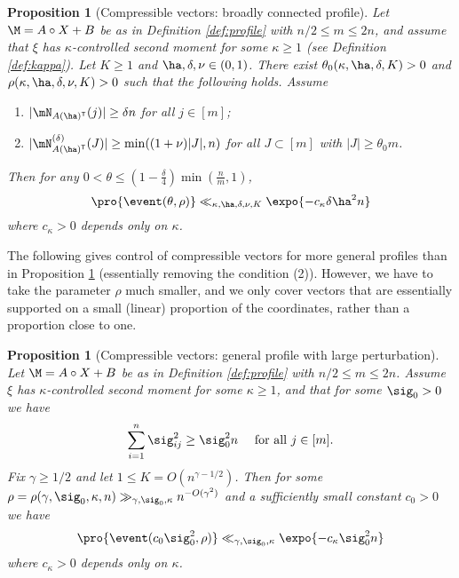 \documentclass[aop,preprint]{imsart}
\theoremstyle{plain}
\newtheorem{proposition}[theorem]{Proposition}
\theoremstyle{definition}
\theoremstyle{remark}
\newtheorem{remark}[theorem]{Remark}
\numberwithin{equation}{section}
\numberwithin{theorem}{section}
\def \tran {\mathsf{T}}
\begin{document}
\begin{proposition}[Compressible vectors: broadly connected profile]	\label{prop:slight}
Let $\M=A\circ X+B$ be as in Definition \ref{def:profile} with $n/2\le m\le 2n$, and assume that $\xi$ has $\kappa$-controlled second moment for some $\kappa\ge1$ (see Definition \ref{def:kappa}).
Let $K\ge1$ and $\ha,\delta,\nu\in (0,1)$.
There exist $\theta_0(\kappa,\ha,\delta,K)>0$ and $\rho(\kappa,\ha,\delta,\nu,K)>0$ such that the following holds. 
Assume
\begin{enumerate}[(1)]
\item $|\mN_{A(\ha)^\tran}(j)|\ge \delta n$ for all $j\in [m]$; \vspace{.2cm}
\item $|\mN_{A(\ha)^\tran}^{(\delta)}(J)| \ge \min((1+\nu)|J|,n)$ for all $J\subset[m]$ with $|J|\ge \theta_0m$.
\end{enumerate}
Then for any $0<\theta\le (1-\frac\delta4)\min(\frac{n}m,1)$, 
\begin{equation}
\pro{\event(\theta,\rho)}\ll_{\kappa,\ha,\delta,\nu,K} \expo{-c_\kappa\delta\ha^2n}
\end{equation}
where $c_\kappa>0$ depends only on $\kappa$.
\end{proposition}


The following gives control of compressible vectors for more general profiles than in Proposition \ref{prop:slight} (essentially removing the condition (2)). 
However, we have to take the parameter $\rho$ much smaller, and we only cover vectors that are essentially supported on a small (linear) proportion of the coordinates, rather than a proportion close to one. 

\begin{proposition}[Compressible vectors: general profile with large perturbation]	\label{prop:comp}
Let $\M=A\circ X+B$ be as in Definition \ref{def:profile} with $n/2\le m\le 2n$.
Assume $\xi$ has $\kappa$-controlled second moment for some $\kappa\ge1$, and that for some $\sig_0>0$ we have
\begin{equation}	\label{LB:columnvar}
\sum_{i=1}^n \sig_{ij}^2\ge \sig_0^2n\quad\text{ for all }j\in [m].
\end{equation}
Fix $\gamma\ge 1/2$ and let $1\le K=O(n^{\gamma-1/2})$.
Then for some $\rho= \rho(\gamma,\sig_0,\kappa,n) \gg_{\gamma,\sig_0,\kappa} n^{-O(\gamma^2)}$ and a sufficiently small constant $c_0>0$ we have
\begin{equation}
\pro{\event(c_0\sig_0^2,\rho)}\ll_{\gamma,\sig_0,\kappa}\expo{-c_\kappa\sig_0^2n}
\end{equation}
where $c_\kappa>0$ depends only on $\kappa$.
\end{proposition}
\end{document}

